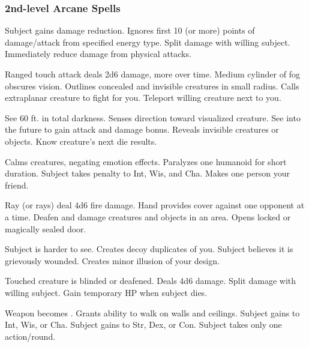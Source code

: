 \subsubsection{2nd-level Arcane Spells} 
\begin{swspelllist}
   Subject gains damage reduction.
   Ignores first 10 (or more) points of damage/attack from specified energy type.
   Split damage with willing subject.
   Immediately reduce damage from physical attacks.

   Ranged touch attack deals 2d6 damage, more over time.
   Medium cylinder of fog obscures vision.
   Outlines concealed and invisible creatures in small radius.
   Calls extraplanar creature to fight for you.
   Teleport willing creature next to you.

   See 60 ft. in total darkness.
   Senses direction toward visualized creature.
   See into the future to gain attack and damage bonus.
   Reveals invisible creatures or objects.
   Know creature's next die results.

   Calms creatures, negating emotion effects.
   Paralyzes one humanoid for short duration.
   Subject takes  penalty to Int, Wis, and Cha.
   Makes one person your friend.

   Ray (or rays) deal 4d6 fire damage.
   Hand provides cover against one opponent at a time.
   Deafen and damage creatures and objects in an area. 
   Opens locked or magically sealed door.

   Subject is harder to see.
   Creates decoy duplicates of you.
   Subject believes it is grievously wounded.
   Creates minor illusion of your design.

   Touched creature is blinded or deafened.
   Deals 4d6 damage.
   Split damage with willing subject.
   Gain temporary HP when subject dies.

   Weapon becomes .
   Grants ability to walk on walls and ceilings.
   Subject gains  to Int, Wis, or Cha.
   Subject gains  to Str, Dex, or Con.
   Subject takes only one action/round.
\end{swspelllist}

